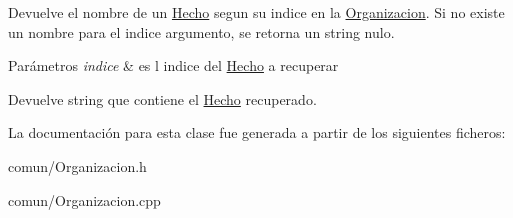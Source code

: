 \-Devuelve el nombre de un \hyperlink{classHecho}{\-Hecho} segun su indice en la \hyperlink{classOrganizacion}{\-Organizacion}. \-Si no existe un nombre para el indice argumento, se retorna un string nulo. 


\begin{DoxyParams}{\-Parámetros}
{\em indice} & es l indice del \hyperlink{classHecho}{\-Hecho} a recuperar \\
\hline
\end{DoxyParams}
\begin{DoxyReturn}{\-Devuelve}
string que contiene el \hyperlink{classHecho}{\-Hecho} recuperado. 
\end{DoxyReturn}


\-La documentación para esta clase fue generada a partir de los siguientes ficheros\-:\begin{DoxyCompactItemize}
\item 
comun/\-Organizacion.\-h\item 
comun/\-Organizacion.\-cpp\end{DoxyCompactItemize}
